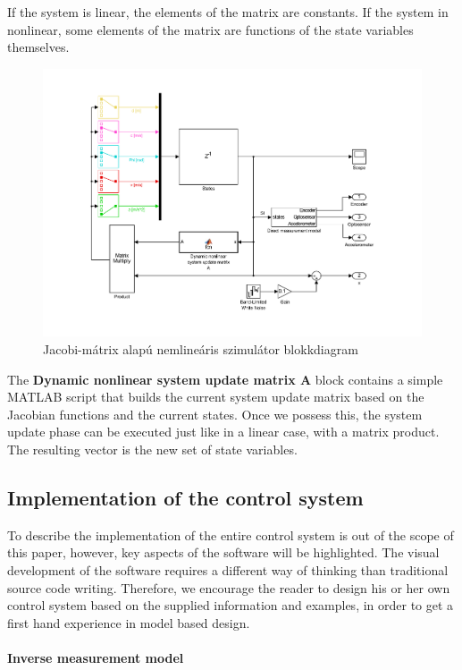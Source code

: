 If the system is linear, the elements of the matrix are constants. If the system in nonlinear, some elements of the matrix are functions of the state variables themselves.

\begin{figure}[!ht]
    \centering
    \includegraphics[width=0.7\linewidth]{img/sys}
    \centering
    \vspace{-30pt}
    \caption{Jacobi-mátrix alapú nemlineáris szimulátor blokkdiagram}
    \label{fig:model}
\end{figure}

The \textbf{Dynamic nonlinear system update matrix A} block contains a simple MATLAB script that builds the current system update matrix based on the Jacobian functions and the current states. Once we possess this, the system update phase can be executed just like in a linear case, with a matrix product. The resulting vector is the new set of state variables.

\subsection{Implementation of the control system}

To describe the implementation of the entire control system is out of the scope of this paper, however, key aspects of the software will be highlighted. The visual development of the software requires a different way of thinking than traditional source code writing. Therefore, we encourage the reader to design his or her own control system based on the supplied information and examples, in order to get a first hand experience in model based design.

\paragraph{Inverse measurement model}

